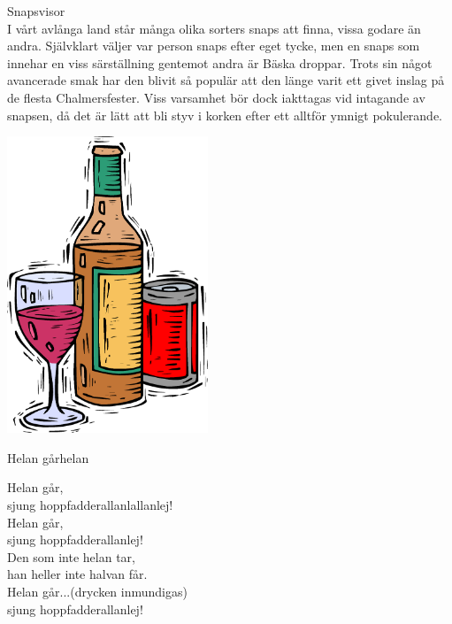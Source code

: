  \begin{flushleft}
{\Huge Snapsvisor\\}
\vspace{1 cm}
{\Large
I vårt avlånga land står många olika sorters snaps att finna, vissa godare
än andra. Självklart väljer var person snaps efter eget tycke, men en snaps som innehar en viss särställning gentemot andra är
Bäska droppar. Trots sin något avancerade smak har den blivit så populär
att den länge varit ett givet inslag på de flesta Chalmersfester. Viss varsamhet bör
dock iakttagas vid intagande av snapsen, då det är lätt att bli styv i
korken efter ett alltför ymnigt pokulerande. 
}
\end{flushleft}
\vspace{2cm}
\begin{center}
\includegraphics[width=6cm]{bilder/8.eps}
\end{center}

\newpage

\begin{song}{Helan går}{helan}
\begin{vers}
Helan går,\\
sjung hoppfadderallanlallanlej!\\
Helan går,\\
sjung hoppfadderallanlej!\\
Den som inte helan tar,\\
han heller inte halvan får.\\
Helan går...(drycken inmundigas)\\
sjung hoppfadderallanlej!\\
\end{vers}
\end{song}


